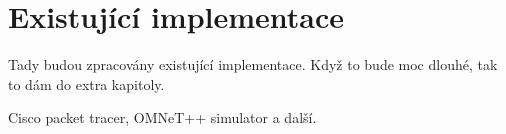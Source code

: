 \chapter{Existující implementace}
Tady budou zpracovány existující implementace. Když to bude moc dlouhé, tak to dám do extra kapitoly.

Cisco packet tracer, OMNeT++ simulator a další.
